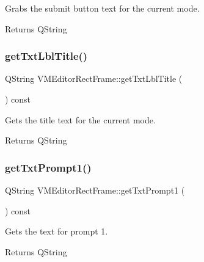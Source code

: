Grabs the submit button text for the current mode. 

\begin{DoxyReturn}{Returns}
Q\+String 
\end{DoxyReturn}
\mbox{\label{class_v_m_editor_rect_frame_a6a264071219d7ecd70bd488c28ccb186}} 
\subsubsection{\texorpdfstring{getTxtLblTitle()}{getTxtLblTitle()}}
{\footnotesize\ttfamily Q\+String V\+M\+Editor\+Rect\+Frame\+::get\+Txt\+Lbl\+Title (\begin{DoxyParamCaption}{ }\end{DoxyParamCaption}) const}



Gets the title text for the current mode. 

\begin{DoxyReturn}{Returns}
Q\+String 
\end{DoxyReturn}
\mbox{\label{class_v_m_editor_rect_frame_a0eb52752938820c82bcebf8b372164bf}} 
\subsubsection{\texorpdfstring{getTxtPrompt1()}{getTxtPrompt1()}}
{\footnotesize\ttfamily Q\+String V\+M\+Editor\+Rect\+Frame\+::get\+Txt\+Prompt1 (\begin{DoxyParamCaption}{ }\end{DoxyParamCaption}) const}



Gets the text for prompt 1. 

\begin{DoxyReturn}{Returns}
Q\+String 
\end{DoxyReturn}
\mbox{\label{class_v_m_editor_rect_frame_add4d767616edfde7a5133aafc44dbd8e}} 
